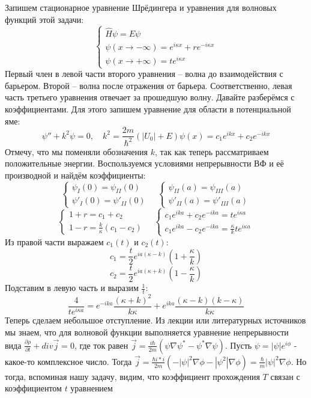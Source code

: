 Запишем стационарное уравнение Шрёдингера и уравнения для волновых функций этой задачи:
\[
\begin{cases}
\hat H\psi=E\psi \\
\psi(x\rightarrow -\infty) = e^{i\kappa x} + re^{-i\kappa x} \\
\psi(x \rightarrow +\infty) = te^{i\kappa x}
\end{cases}
\]
Первый член в левой части второго уравнения – волна до взаимодействия с барьером. Второй – волна после отражения от барьера. Соответственно, левая часть третьего уравнения отвечает за прошедшую волну. Давайте разберёмся с коэффициентами. Для этого запишем уравнение для области в потенциальной яме:
\[
\psi'' + k^2\psi = 0, \quad k^2 = \frac{2m}{\hbar^2}(|U_0| + E)
\psi(x) = c_1e^{ikx} + c_2e^{-ikx}
\]
Отмечу, что мы поменяли обозначения $k$, так как теперь рассматриваем положительные энергии. Воспользуемся условиями непрерывности ВФ и её производной и найдём коэффициенты:
\[
\begin{cases}
    \psi_I(0) = \psi_{II}(0) \\
    \psi'_I(0) = \psi'_{II}(0) 
\end{cases}
\quad
\begin{cases}
    \psi_{II}(a) = \psi_{III}(a) \\
    \psi'_{II}(a) = \psi'_{III}(a) 
\end{cases}
\]
\[
\begin{cases}
    1 + r = c_1 + c_2 \\
    1-r = \frac{k}{\kappa}(c_1 - c_2) 
\end{cases}
\quad
\begin{cases}
    c_1e^{ika} + c_2e^{-ika} = te^{i\kappa a}\\
    c_1e^{ika} - c_2e^{-ika} = \frac{\kappa}{k}te^{i\kappa a}
\end{cases}
\]
Из правой части выражаем $c_1(t)$ и $c_2(t)$:
\[
c_1 = \frac{t}{2}e^{ia(\kappa - k)}(1 + \frac{\kappa}{k})
\]
\[
c_2 = \frac{t}{2}e^{ia(\kappa + k)}(1 - \frac{\kappa}{k})
\]
Подставим в левую часть и выразим $\frac{1}{t}$:
\[
\frac{4}{te^{i\kappa a}} = e^{-ika}\frac{(\kappa + k)^2}{k\kappa} + e^{ika}\frac{(\kappa - k)(k - \kappa)}{k\kappa}
\]
Теперь сделаем небольшое отступление. Из лекции или литературных источников мы знаем, что для волновой функции выполняется уравнение непрерывности вида $\frac{\partial \rho}{\partial t} + div \vec{j} = 0$, где ток равен $\vec{j} = \frac{i\hbar}{2m}(\psi\nabla\psi^* - \psi^*\nabla\psi)$. Пусть $\psi = |\psi|e^{i\phi}$ - какое-то комплексное число. Тогда $\vec{j} = \frac{\hbar i*i}{2m}(-|\psi|^2\nabla\phi - |\psi^2|\nabla\phi) = \frac{\hbar}{m}|\psi|^2\nabla\phi$. Но тогда, вспоминая нашу задачу, видим, что коэффициент прохождения $T$ связан с коэффициентом $t$ уравнением 
